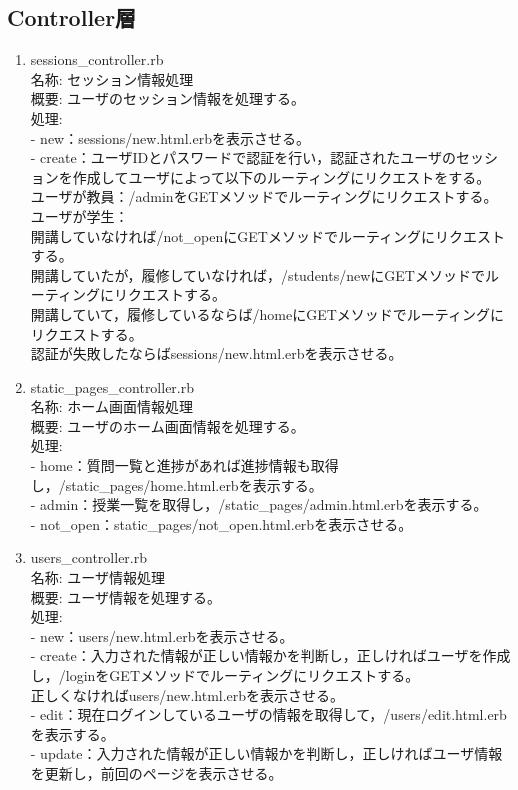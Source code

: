 \subsection{Controller層}
\begin{enumerate}
\item sessions\_controller.rb\\
名称:
セッション情報処理\\
概要:
ユーザのセッション情報を処理する。\\
処理:\\
- new：sessions/new.html.erbを表示させる。\\
- create：ユーザIDとパスワードで認証を行い，認証されたユーザのセッションを作成してユーザによって以下のルーティングにリクエストをする。\\
         ユーザが教員：/adminをGETメソッドでルーティングにリクエストする。\\
         ユーザが学生：\\
                    開講していなければ/not\_openにGETメソッドでルーティングにリクエストする。\\
                    開講していたが，履修していなければ，/students/newにGETメソッドでルーティングにリクエストする。\\
                    開講していて，履修しているならば/homeにGETメソッドでルーティングにリクエストする。\\
         認証が失敗したならばsessions/new.html.erbを表示させる。

\item static\_pages\_controller.rb\\
名称:
ホーム画面情報処理\\
概要:
ユーザのホーム画面情報を処理する。\\
処理:\\
- home：質問一覧と進捗があれば進捗情報も取得し，/static\_pages/home.html.erbを表示する。\\
- admin：授業一覧を取得し，/static\_pages/admin.html.erbを表示する。\\
- not\_open：static\_pages/not\_open.html.erbを表示させる。

\item users\_controller.rb\\
名称:
ユーザ情報処理\\
概要:
ユーザ情報を処理する。\\
処理:\\
- new：users/new.html.erbを表示させる。\\
- create：入力された情報が正しい情報かを判断し，正しければユーザを作成し，/loginをGETメソッドでルーティングにリクエストする。\\
         正しくなければusers/new.html.erbを表示させる。\\
- edit：現在ログインしているユーザの情報を取得して，/users/edit.html.erbを表示する。\\
- update：入力された情報が正しい情報かを判断し，正しければユーザ情報を更新し，前回のページを表示させる。


\end{enumerate}
